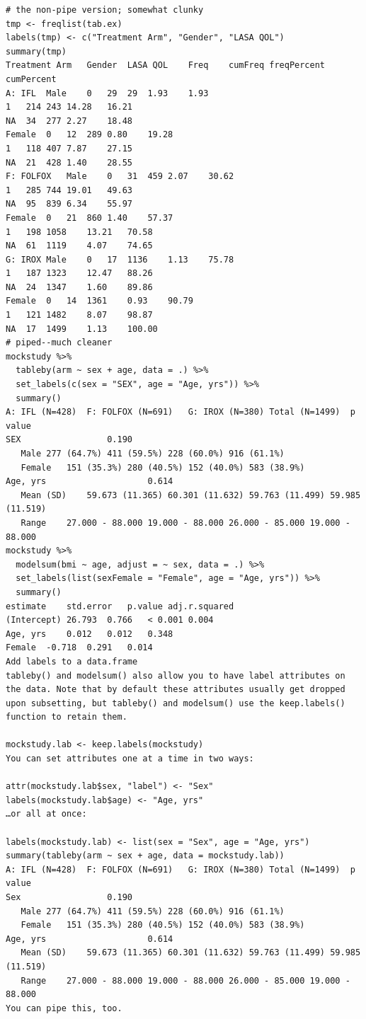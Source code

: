 \documentclass[
]{book}
\begin{document}
\begin{verbatim}
# the non-pipe version; somewhat clunky
tmp <- freqlist(tab.ex)
labels(tmp) <- c("Treatment Arm", "Gender", "LASA QOL")
summary(tmp)
Treatment Arm   Gender  LASA QOL    Freq    cumFreq freqPercent cumPercent
A: IFL  Male    0   29  29  1.93    1.93
1   214 243 14.28   16.21
NA  34  277 2.27    18.48
Female  0   12  289 0.80    19.28
1   118 407 7.87    27.15
NA  21  428 1.40    28.55
F: FOLFOX   Male    0   31  459 2.07    30.62
1   285 744 19.01   49.63
NA  95  839 6.34    55.97
Female  0   21  860 1.40    57.37
1   198 1058    13.21   70.58
NA  61  1119    4.07    74.65
G: IROX Male    0   17  1136    1.13    75.78
1   187 1323    12.47   88.26
NA  24  1347    1.60    89.86
Female  0   14  1361    0.93    90.79
1   121 1482    8.07    98.87
NA  17  1499    1.13    100.00
# piped--much cleaner
mockstudy %>% 
  tableby(arm ~ sex + age, data = .) %>% 
  set_labels(c(sex = "SEX", age = "Age, yrs")) %>% 
  summary()
A: IFL (N=428)  F: FOLFOX (N=691)   G: IROX (N=380) Total (N=1499)  p value
SEX                 0.190
   Male 277 (64.7%) 411 (59.5%) 228 (60.0%) 916 (61.1%) 
   Female   151 (35.3%) 280 (40.5%) 152 (40.0%) 583 (38.9%) 
Age, yrs                    0.614
   Mean (SD)    59.673 (11.365) 60.301 (11.632) 59.763 (11.499) 59.985 (11.519) 
   Range    27.000 - 88.000 19.000 - 88.000 26.000 - 85.000 19.000 - 88.000 
mockstudy %>% 
  modelsum(bmi ~ age, adjust = ~ sex, data = .) %>% 
  set_labels(list(sexFemale = "Female", age = "Age, yrs")) %>% 
  summary()
estimate    std.error   p.value adj.r.squared
(Intercept) 26.793  0.766   < 0.001 0.004
Age, yrs    0.012   0.012   0.348   
Female  -0.718  0.291   0.014   
Add labels to a data.frame
tableby() and modelsum() also allow you to have label attributes on the data. Note that by default these attributes usually get dropped upon subsetting, but tableby() and modelsum() use the keep.labels() function to retain them.

mockstudy.lab <- keep.labels(mockstudy)
You can set attributes one at a time in two ways:

attr(mockstudy.lab$sex, "label") <- "Sex"
labels(mockstudy.lab$age) <- "Age, yrs"
…or all at once:

labels(mockstudy.lab) <- list(sex = "Sex", age = "Age, yrs")
summary(tableby(arm ~ sex + age, data = mockstudy.lab))
A: IFL (N=428)  F: FOLFOX (N=691)   G: IROX (N=380) Total (N=1499)  p value
Sex                 0.190
   Male 277 (64.7%) 411 (59.5%) 228 (60.0%) 916 (61.1%) 
   Female   151 (35.3%) 280 (40.5%) 152 (40.0%) 583 (38.9%) 
Age, yrs                    0.614
   Mean (SD)    59.673 (11.365) 60.301 (11.632) 59.763 (11.499) 59.985 (11.519) 
   Range    27.000 - 88.000 19.000 - 88.000 26.000 - 85.000 19.000 - 88.000 
You can pipe this, too.


\end{verbatim}
\end{document}
